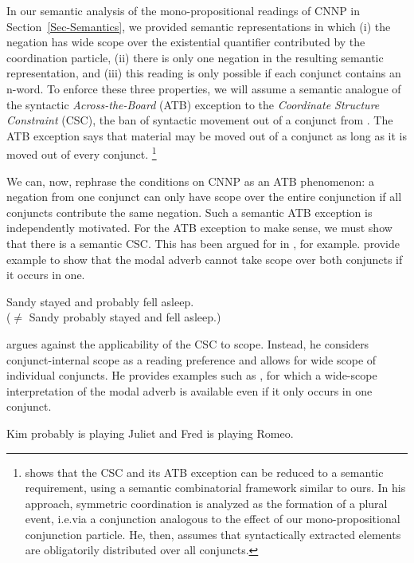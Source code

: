\documentclass[output=paper]{langsci/langscibook}
\begin{document}
In our semantic analysis of the mono-propositional readings of CNNP in Section~\ref{Sec-Semantics}, we provided semantic representations in which (i) the negation has wide scope over the existential quantifier contributed by the coordination particle, (ii) there is only one negation in the resulting semantic representation, and (iii) this reading  is only possible if each conjunct contains an n-word.
%
To enforce these three properties, we will assume a semantic analogue of the syntactic \emph{Across-the-Board} (ATB) exception to the \emph{Coordinate Structure Constraint} (CSC), the ban of syntactic movement out of a conjunct from \citet{Ross:67}. The ATB exception says that material may be moved out of a conjunct as long as it is moved out of every conjunct.%
\footnote{
\citet{Chaves:12} shows that the CSC and its ATB exception can be reduced to a semantic requirement, using a semantic combinatorial framework similar to ours. 
In his approach, symmetric coordination is analyzed as the formation of a plural event, i.e.\@ via a conjunction analogous to the effect of our mono-propositional conjunction particle. He, then, assumes that syntactically extracted elements are obligatorily distributed over all conjuncts. 
}

We can, now, rephrase the conditions on CNNP as an ATB phenomenon: a negation from one conjunct can only have scope over the entire conjunction if all conjuncts contribute the same negation. 
%
Such a semantic ATB exception is independently motivated. For the ATB exception to make sense, we must show that there is a semantic CSC. This has been argued for in 
\cite[83]{Winter:01}, for example.
\cite[323]{Copestake:al:05} 
 provide example  to show that the modal adverb  cannot take scope over both conjuncts if it occurs in one.

\ea \label{stay-asleep}
Sandy stayed and probably fell asleep.\\
($\not=$ Sandy probably stayed and fell asleep.)
\z

\cite[86--89]{Chaves:07} argues against the applicability of the CSC to scope. Instead, he considers conjunct-internal scope as a reading preference and allows for wide scope of individual conjuncts. He provides examples such as , for which a wide-scope interpretation of the modal adverb is available even if it only occurs in one conjunct.

\ea \label{romeojuliet}
Kim probably is playing Juliet and Fred is playing Romeo.
\z 
\end{document}

